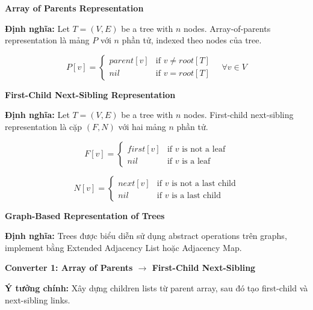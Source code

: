 \documentclass[12pt,a4paper]{article}
\begin{document}
\textbf{Array of Parents Representation}
\vspace{0.5cm}

\textbf{Định nghĩa:} Let $T = (V, E)$ be a tree with $n$ nodes. Array-of-parents representation là mảng $P$ với $n$ phần tử, indexed theo nodes của tree.

$$P[v] = \begin{cases}
parent[v] & \text{if } v \neq root[T] \\
nil & \text{if } v = root[T]
\end{cases} \quad \forall v \in V$$




\textbf{First-Child Next-Sibling Representation}
\vspace{0.5cm}

\textbf{Định nghĩa:} Let $T = (V, E)$ be a tree with $n$ nodes. First-child next-sibling representation là cặp $(F, N)$ với hai mảng $n$ phần tử.

$$F[v] = \begin{cases}
first[v] & \text{if } v \text{ is not a leaf} \\
nil & \text{if } v \text{ is a leaf}
\end{cases}$$

$$N[v] = \begin{cases}
next[v] & \text{if } v \text{ is not a last child} \\
nil & \text{if } v \text{ is a last child}
\end{cases}$$

\vspace{0.5cm}

\textbf{Graph-Based Representation of Trees}
\vspace{0.5cm}

\textbf{Định nghĩa:} Trees được biểu diễn sử dụng abstract operations trên graphs, implement bằng Extended Adjacency List hoặc Adjacency Map.


\vspace{0.5cm}

\textbf{Converter 1: Array of Parents $\rightarrow$ First-Child Next-Sibling}
\vspace{0.5cm}

\textbf{Ý tưởng chính:} Xây dựng children lists từ parent array, sau đó tạo first-child và next-sibling links.
\end{document}
